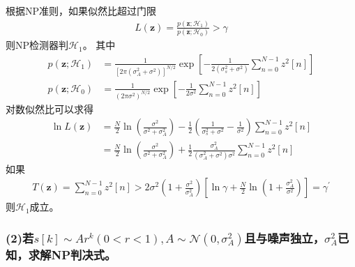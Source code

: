 \documentclass[fontset=windows]{article}
\numberwithin{figure}{section}
\begin{document}
根据NP准则，如果似然比超过门限
\begin{align*}
	L(\mathbf{z})=\frac{p(\mathbf{z};\mathcal{H}_1)}{p(\mathbf{z};\mathcal{H}_0)}>\gamma
\end{align*}
则NP检测器判\(\mathcal{H}_1\)。
其中
\begin{align*}
	p(\mathbf{z};\mathcal{H}_1)
	 & =\frac{1}{[2\pi (\sigma_A^2+\sigma^2)]^{N/2}}\exp
	\left[-\frac{1}{2(\sigma^2_s+\sigma^2)}\sum_{n=0}^{N-1}z^2[n] \right] \\
	p(\mathbf{z};\mathcal{H}_0)
	 & =\frac{1}{(2\pi\sigma^2)^{N/2}}\exp
	\left[-\frac{1}{2\sigma^2}\sum_{n=0}^{N-1}z^2[n] \right]
\end{align*}
对数似然比可以求得
\begin{align*}
	\ln L(\mathbf{z})
	 & =\frac{N}{2}\ln(\frac{\sigma^2}{\sigma^2+\sigma^2_A})-
	\frac{1}{2}(\frac{1}{\sigma^2_s+\sigma^2}-\frac{1}{\sigma^2})\sum_{n=0}^{N-1}z^2[n] \\
	 & =\frac{N}{2}\ln(\frac{\sigma^2}{\sigma^2+\sigma^2_A})
	+\frac{1}{2}\frac{\sigma^2_A}{(\sigma^2_A+\sigma^2)\sigma^2}\sum_{n=0}^{N-1}z^2[n]
\end{align*}
如果
\begin{align*}
	T(\mathbf{z})=\sum_{n=0}^{N-1}z^2[n]>2\sigma^2(1+\frac{\sigma^2}{\sigma^2_A})\left[\ln \gamma+\frac{N}{2}\ln(1+\frac{\sigma^2_A}{\sigma^2})\right]=\gamma^{\prime}
\end{align*}
则\(\mathcal{H}_1\)成立。

\subsubsection*{(2)若\(s[k]\sim Ar^k(0<r<1),A\sim \mathcal{N}(0,\sigma^2_A)\)且与噪声独立，\(\sigma^2_A\)已知，求解NP判决式。}
\end{document}
